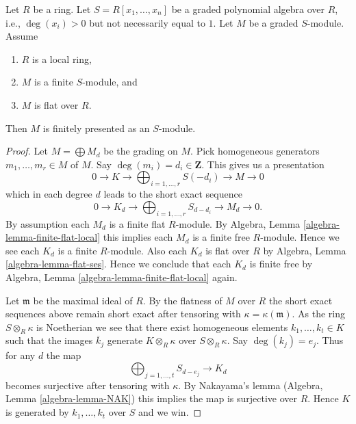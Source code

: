\begin{lemma}
\label{lemma-flat-graded-finite-type-finite-presentation-module}
Let $R$ be a ring.
Let $S = R[x_1, \ldots, x_n]$ be a graded polynomial algebra over $R$,
i.e., $\deg(x_i) > 0$ but not necessarily equal to $1$.
Let $M$ be a graded $S$-module.
Assume
\begin{enumerate}
\item $R$ is a local ring,
\item $M$ is a finite $S$-module, and
\item $M$ is flat over $R$.
\end{enumerate}
Then $M$ is finitely presented as an $S$-module.
\end{lemma}

\begin{proof}
Let $M = \bigoplus M_d$ be the grading on $M$.
Pick homogeneous generators $m_1, \ldots, m_r \in M$ of $M$.
Say $\deg(m_i) = d_i \in \mathbf{Z}$. This gives us a presentation
$$
0 \to K \to \bigoplus\nolimits_{i = 1, \ldots, r} S(-d_i) \to M \to 0
$$
which in each degree $d$ leads to the short exact sequence
$$
0 \to K_d \to \bigoplus\nolimits_{i = 1, \ldots, r} S_{d - d_i} \to
M_d \to 0.
$$
By assumption each $M_d$ is a finite flat $R$-module. By
Algebra, Lemma \ref{algebra-lemma-finite-flat-local}
this implies each $M_d$ is a finite free $R$-module. Hence
we see each $K_d$ is a finite $R$-module. Also each $K_d$ is flat
over $R$ by
Algebra, Lemma \ref{algebra-lemma-flat-ses}.
Hence we conclude that each $K_d$ is finite free by
Algebra, Lemma \ref{algebra-lemma-finite-flat-local}
again.

\medskip\noindent
Let $\mathfrak m$ be the maximal ideal of $R$. By the flatness of $M$
over $R$ the short exact sequences above remain short exact after tensoring
with $\kappa = \kappa(\mathfrak m)$. As the ring $S \otimes_R \kappa$ is
Noetherian we see that there exist homogeneous elements
$k_1, \ldots, k_t \in K$ such that the images $\overline{k}_j$
generate $K \otimes_R \kappa$ over $S \otimes_R \kappa$. Say $\deg(k_j) = e_j$.
Thus for any $d$ the map
$$
\bigoplus\nolimits_{j = 1, \ldots, t} S_{d - e_j}
\longrightarrow
K_d
$$
becomes surjective after tensoring with $\kappa$. By
Nakayama's lemma
(Algebra, Lemma \ref{algebra-lemma-NAK})
this implies the map is surjective over $R$. Hence $K$ is generated
by $k_1, \ldots, k_t$ over $S$ and we win.
\end{proof}

